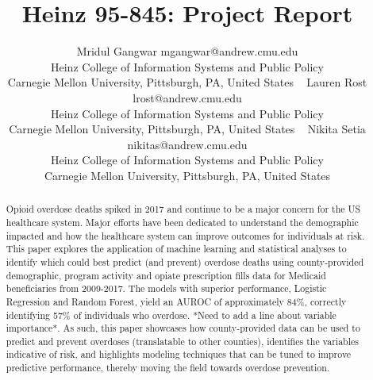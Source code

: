 \documentclass[twoside,10.5pt]{article}
\begin{document}
\title{Heinz 95-845: Project Report}

\author{\name Mridul Gangwar \email mgangwar@andrew.cmu.edu \\
       \addr Heinz College of Information Systems and Public Policy\\
       Carnegie Mellon University, Pittsburgh, PA, United States \
       \AND
       \name Lauren Rost \email lrost@andrew.cmu.edu \\
       \addr Heinz College of Information Systems and Public Policy\\
       Carnegie Mellon University, Pittsburgh, PA, United States \
       \AND
       \name Nikita Setia \email nikitas@andrew.cmu.edu \\
       \addr Heinz College of Information Systems and Public Policy\\
       Carnegie Mellon University, Pittsburgh, PA, United States}
       
\maketitle
\vspace*{5px}
\begin{abstract}
Opioid overdose deaths spiked in 2017 and continue to be a major concern for the US healthcare system. Major efforts have been dedicated to understand the demographic impacted and how the healthcare system can improve outcomes for individuals at risk. This paper explores the application of machine learning and statistical analyses to identify which could best predict (and prevent) overdose deaths using county-provided demographic, program activity and opiate prescription fills data for Medicaid beneficiaries from 2009-2017. The models with superior performance, Logistic Regression and Random Forest, yield an AUROC of approximately 84\%, correctly identifying 57\% of individuals who overdose. *Need to add a line about variable importance*. As such, this paper showcases how county-provided data can be used to predict and prevent overdoses (translatable to other counties), identifies the variables indicative of risk, and highlights modeling techniques that can be tuned to improve predictive performance, thereby moving the field towards overdose prevention.  
\end{abstract}
\end{document}
